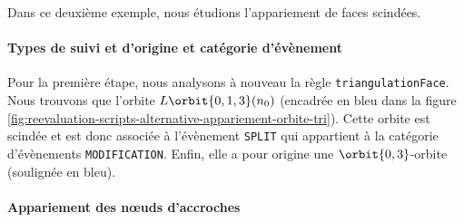 
Dans ce deuxième exemple, nous étudions l'appariement de faces scindées. %

\paragraph{Types de suivi et d'origine et catégorie d'évènement}

Pour la première étape, nous analysons à nouveau la règle
\texttt{triangulation\-Face}. %
Nous trouvons que l'orbite \(L\orbit{0,1,3}(n_{0})\) (encadrée en
\textcolor{myblueink}{bleu} dans la figure
\ref{fig:reevaluation-scripts-alternative-appariement-orbite-tri}). %
Cette orbite est scindée et est donc associée à l'évènement \texttt{SPLIT} qui
appartient à la catégorie d'évènements \texttt{MO\-DI\-FI\-CA\-T\-I\-ON}. %
Enfin, elle a pour origine une \(\orbit{0,3}\)-orbite (soulignée en
\textcolor{myblueink}{bleu}). %

\paragraph{Appariement des n\oe uds d'accroches}

